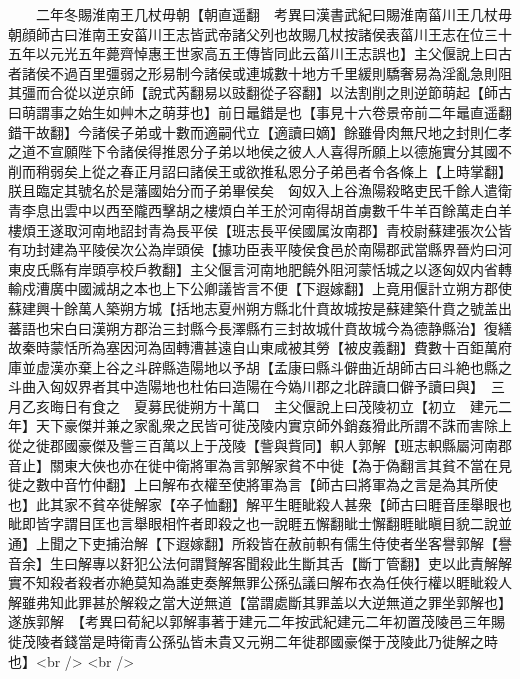 　　二年冬賜淮南王几杖毋朝【朝直遥翻　考異曰漢書武紀曰賜淮南菑川王几杖毋朝顔師古曰淮南王安菑川王志皆武帝諸父列也故賜几杖按諸侯表菑川王志在位三十五年以元光五年薨齊悼惠王世家高五王傳皆同此云菑川王志誤也】主父偃說上曰古者諸侯不過百里彊弱之形易制今諸侯或連城數十地方千里緩則驕奢易為淫亂急則阻其彊而合從以逆京師【說式芮翻易以豉翻從子容翻】以法割削之則逆節萌起【師古曰萌謂事之始生如艸木之萌芽也】前日鼂錯是也【事見十六卷景帝前二年鼂直遥翻錯干故翻】今諸侯子弟或十數而適嗣代立【適讀曰嫡】餘雖骨肉無尺地之封則仁孝之道不宣願陛下令諸侯得推恩分子弟以地侯之彼人人喜得所願上以德施實分其國不削而稍弱矣上從之春正月詔曰諸侯王或欲推私恩分子弟邑者令各條上【上時掌翻】朕且臨定其號名於是藩國始分而子弟畢侯矣　匈奴入上谷漁陽殺略吏民千餘人遣衛青李息出雲中以西至隴西擊胡之樓煩白羊王於河南得胡首虜數千牛羊百餘萬走白羊樓煩王遂取河南地詔封青為長平侯【班志長平侯國属汝南郡】青校尉蘇建張次公皆有功封建為平陵侯次公為岸頭侯【據功臣表平陵侯食邑於南陽郡武當縣界晉灼曰河東皮氏縣有岸頭亭校戶教翻】主父偃言河南地肥饒外阻河蒙恬城之以逐匈奴内省轉輸戍漕廣中國滅胡之本也上下公卿議皆言不便【下遐嫁翻】上竟用偃計立朔方郡使蘇建興十餘萬人築朔方城【括地志夏州朔方縣北什賁故城按是蘇建築什賁之號盖出蕃語也宋白曰漢朔方郡治三封縣今長澤縣冇三封故城什賁故城今為德静縣治】復繕故秦時蒙恬所為塞因河為固轉漕甚遠自山東咸被其勞【被皮義翻】費數十百鉅萬府庫並虚漢亦棄上谷之斗辟縣造陽地以予胡【孟康曰縣斗僻曲近胡師古曰斗絶也縣之斗曲入匈奴界者其中造陽地也杜佑曰造陽在今媯川郡之北辟讀口僻予讀曰與】　三月乙亥晦日有食之　夏募民徙朔方十萬口　主父偃說上曰茂陵初立【初立　建元二年】天下豪傑并兼之家亂衆之民皆可徙茂陵内實京師外銷姦猾此所謂不誅而害除上從之徙郡國豪傑及訾三百萬以上于茂陵【訾與貲同】軹人郭解【班志軹縣屬河南郡音止】關東大俠也亦在徙中衛將軍為言郭解家貧不中徙【為于偽翻言其貧不當在見徙之數中音竹仲翻】上曰解布衣權至使將軍為言【師古曰將軍為之言是為其所使也】此其家不貧卒徙解家【卒子恤翻】解平生睚眦殺人甚衆【師古曰睚音厓舉眼也眦即皆字謂目匡也言舉眼相忤者即殺之也一說睚五懈翻眦士懈翻睚眦瞋目貌二說並通】上聞之下吏捕治解【下遐嫁翻】所殺皆在赦前軹有儒生侍使者坐客譽郭解【譽音余】生曰解專以姧犯公法何謂賢解客聞殺此生斷其舌【斷丁管翻】吏以此責解解實不知殺者殺者亦絶莫知為誰吏奏解無罪公孫弘議曰解布衣為任俠行權以睚眦殺人解雖弗知此罪甚於解殺之當大逆無道【當謂處斷其罪盖以大逆無道之罪坐郭解也】遂族郭解　【考異曰荀紀以郭解事著于建元二年按武紀建元二年初置茂陵邑三年賜徙茂陵者錢當是時衛青公孫弘皆未貴又元朔二年徙郡國豪傑于茂陵此乃徙解之時也】<br />
<br />
